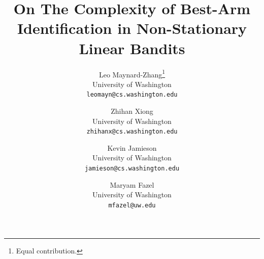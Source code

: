 \documentclass[11pt]{article}
\title{On The Complexity of Best-Arm Identification in Non-Stationary Linear Bandits}
\author{
  Leo Maynard-Zhang\thanks{Equal contribution.} \\ University of Washington \\ \texttt{leomayn@cs.washington.edu}
  \and
  Zhihan Xiong\footnotemark[1] \\ University of Washington \\ \texttt{zhihanx@cs.washington.edu}
  \and
  Kevin Jamieson \\ University of Washington \\ \texttt{jamieson@cs.washington.edu}
  \and
  Maryam Fazel \\ University of Washington \\ \texttt{mfazel@uw.edu}
}
\date{}
\begin{document}
\maketitle

\begin{abstract}
\end{abstract}














\newpage
\appendix






\end{document}
